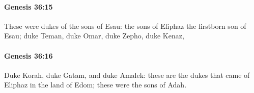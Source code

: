 		\paragraph{Genesis 36:15} %
			\label{GENESIS-36-15}

			These were dukes of the sons of Esau: the sons of Eliphaz the firstborn son of Esau; duke Teman, duke Omar, duke Zepho, duke Kenaz,


		\paragraph{Genesis 36:16} %
			\label{GENESIS-36-16}

			Duke Korah, duke Gatam, and duke Amalek: these are the dukes that came of Eliphaz in the land of Edom; these were the sons of Adah.



